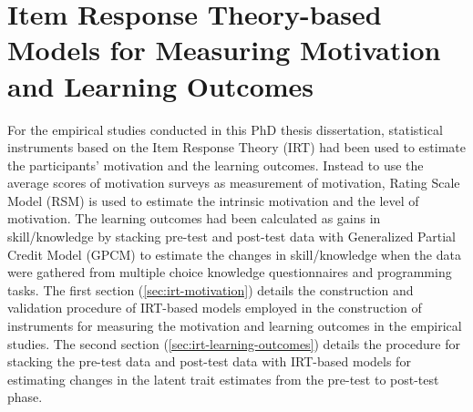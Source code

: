 
\chapter[IRT-based Models for Measuring Motivation and Learning Outcomes]{Item Response Theory-based Models for Measuring Motivation and Learning Outcomes}
\label{appendix:irt-models}

For the empirical studies conducted in this PhD thesis dissertation, statistical instruments based on the Item Response Theory (IRT) had been used to estimate the participants' motivation and the learning outcomes. Instead to use the average scores of motivation surveys as measurement of motivation, Rating Scale Model (RSM) is used to estimate the intrinsic motivation and the level of motivation. The learning outcomes had been calculated as gains in skill/knowledge by stacking pre-test and post-test data with Generalized Partial Credit Model (GPCM) to estimate the changes in skill/knowledge when the data were gathered from multiple choice knowledge questionnaires and programming tasks. The first section (\autoref{sec:irt-motivation}) details the construction and validation procedure of IRT-based models employed in the construction of instruments for measuring the motivation and learning outcomes in the empirical studies. The second section (\autoref{sec:irt-learning-outcomes}) details the procedure for stacking the pre-test data and post-test data with IRT-based models for estimating changes in the latent trait estimates from the pre-test to post-test phase.

